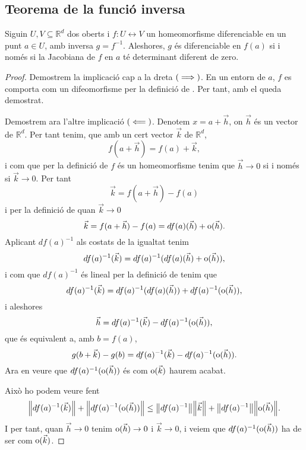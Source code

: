\documentclass[../Apunts.tex]{subfiles}
\begin{document}
	\subsection{Teorema de la funció inversa}
	\begin{proposition}\label{prop:homeomorfisme a difeomorfisme}
		Siguin \(U,V\subseteq\mathbb{R}^{d}\) dos oberts i \(f\colon U\leftrightarrow V\) un homeomorfisme diferenciable en un punt \(a\in U\), amb inversa \(g=f^{-1}\). Aleshores, \(g\) és diferenciable en \(f(a)\) si i només si la Jacobiana de \(f\) en \(a\) té determinant diferent de zero.
		\begin{proof}
			Demostrem la implicació cap a la dreta \((\implies)\). En un entorn de \(a\), \(f\) es comporta com un difeomorfisme per la definició de . Per tant, amb el \corollari{}  queda demostrat.
			
			Demostrem ara l'altre implicació \((\impliedby)\). Denotem \(x=a+\vec{h}\), on \(\vec{h}\) és un vector de \(\mathbb{R}^{d}\). Per tant tenim, que amb un cert vector \(\vec{k}\) de \(\mathbb{R}^{d}\),
			\[f(a+\vec{h})=f(a)+\vec{k},\]
			i com que per la definició de  \(f\) és un homeomorfisme  tenim que \(\vec{h}\to0\) si i només si \(\vec{k}\to0\). Per tant
			\[\vec{k}=f(a+\vec{h})-f(a)\]
			i per la definició de  quan \(\vec{k}\to0\)
			\[\vec{k}=f(a+\vec{h})-f(a)=df(a)(\vec{h})+\operatorname{o}(\vec{h}).\]
			Aplicant \(df(a)^{-1}\) als costats de la igualtat tenim
			\[df(a)^{-1}(\vec{k})=df(a)^{-1}(df(a)(\vec{h})+\operatorname{o}(\vec{h})),\]
			i com que \(df(a)^{-1}\) és lineal per la definició de  tenim que
			\[df(a)^{-1}(\vec{k})=df(a)^{-1}(df(a)(\vec{h}))+df(a)^{-1}(\operatorname{o}(\vec{h})),\]
			i aleshores
			\[\vec{h}=df(a)^{-1}(\vec{k})-df(a)^{-1}(\operatorname{o}(\vec{h})),\]
			que és equivalent a, amb \(b=f(a)\),
			\[g(b+\vec{k})-g(b)=df(a)^{-1}(\vec{k})-df(a)^{-1}(\operatorname{o}(\vec{h})).\]
			Ara en veure que \(df(a)^{-1}(\operatorname{o}(\vec{h}))\) és com \(\operatorname{o}(\vec{k})\) haurem acabat.
			
			Això ho podem veure fent
			\[\norm{df(a)^{-1}(\vec{k})}+\norm{df(a)^{-1}(\omicron(\vec{h}))}\leq\norm{df(a)^{-1}}\norm{\vec{k}}+\norm{df(a)^{-1}}\norm{\omicron(\vec{h})}.\]
			I per tant, quan \(\vec{h}\to0\) tenim \(\operatorname{o}(\vec{h})\to0\) i \(\vec{k}\to0\), i veiem que \(df(a)^{-1}(\operatorname{o}(\vec{h}))\) ha de ser com \(\operatorname{o}(\vec{k})\). %
		\end{proof}
	\end{proposition}
\end{document}
